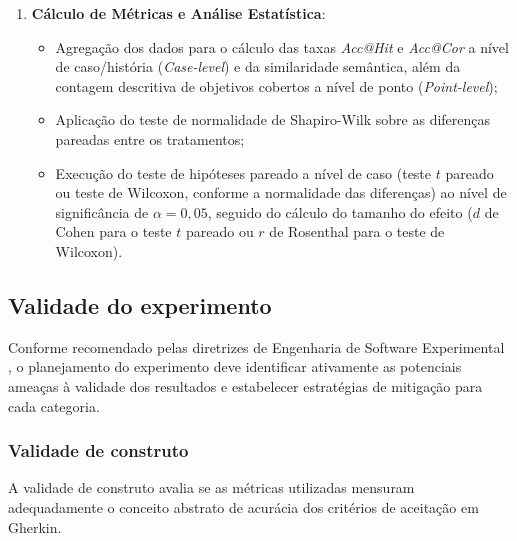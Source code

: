 \begin{enumerate}
    \item \textbf{Cálculo de Métricas e Análise Estatística}:
    \begin{itemize}
        \item Agregação dos dados para o cálculo das taxas \textit{Acc@Hit} e \textit{Acc@Cor} a nível de caso/história (\textit{Case-level}) e da similaridade semântica, além da contagem descritiva de objetivos cobertos a nível de ponto (\textit{Point-level});
        \item Aplicação do teste de normalidade de Shapiro-Wilk sobre as diferenças pareadas entre os tratamentos;
        \item Execução do teste de hipóteses pareado a nível de caso (teste $t$ pareado ou teste de Wilcoxon, conforme a normalidade das diferenças) ao nível de significância de $\alpha = 0{,}05$, seguido do cálculo do tamanho do efeito ($d$ de Cohen para o teste $t$ pareado ou $r$ de Rosenthal para o teste de Wilcoxon).
    \end{itemize}
\end{enumerate}

\subsection{Validade do experimento}
\label{sec:validade}


Conforme recomendado pelas diretrizes de Engenharia de Software Experimental \cite{wohlin2000}, o planejamento do experimento deve identificar ativamente as potenciais ameaças à validade dos resultados e estabelecer estratégias de mitigação para cada categoria.

\subsubsection*{Validade de construto}

A validade de construto avalia se as métricas utilizadas mensuram adequadamente o conceito abstrato de acurácia dos critérios de aceitação em Gherkin.

